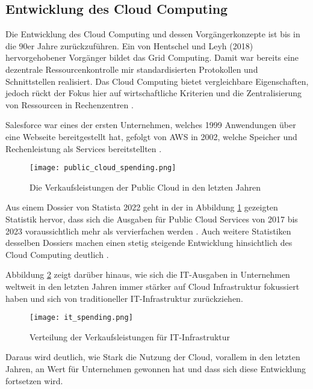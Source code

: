 \subsection{Entwicklung des Cloud Computing}
Die Entwicklung des Cloud Computing und dessen Vorgängerkonzepte ist bis in die 90er Jahre zurückzuführen. Ein von Hentschel und Leyh (2018) hervorgehobener Vorgänger bildet das Grid Computing. Damit war bereits eine dezentrale Ressourcenkontrolle mir standardisierten Protokollen und Schnittstellen realisiert. Das Cloud Computing bietet vergleichbare Eigenschaften, jedoch rückt der Fokus hier auf wirtschaftliche Kriterien und die Zentralisierung von Ressourcen in Rechenzentren \cite[Vgl.][S. 5f]{Reinheimer2018}.

Salesforce war eines der ersten Unternehmen, welches 1999 Anwendungen über eine Webseite bereitgestellt hat, gefolgt von \ac{AWS} in 2002, welche Speicher und Rechenleistung als Services bereitstellten \cite[Vgl.][S. 17f]{Srivastava2018}.

\begin{figure}[H]
    \texttt{[image: public\_cloud\_spending.png]}
    \caption{Die Verkaufsleistungen der Public Cloud in den letzten Jahren \cite[S. 8]{Statista2022}}
    \label{fig:public_cloud_spending}
\end{figure}

Aus einem Dossier von Statista 2022 geht in der in Abbildung \ref{fig:public_cloud_spending} gezeigten Statistik hervor, dass sich die Ausgaben für Public Cloud Services von 2017 bis 2023 voraussichtlich mehr als vervierfachen werden \cite[Vgl.][S. 8]{Statista2022}. Auch weitere Statistiken desselben Dossiers machen einen stetig steigende Entwicklung hinsichtlich des Cloud Computing deutlich \cite[Vgl. unter anderem][S. 11ff]{Statista2022}. \pagebreak

Abbildung \ref{fig:it-spending} zeigt darüber hinaus, wie sich die IT-Ausgaben in Unternehmen weltweit in den letzten Jahren immer stärker auf Cloud Infrastruktur fokussiert haben und sich von traditioneller IT-Infrastruktur zurückziehen.

\begin{figure}[H]
    \texttt{[image: it\_spending.png]}
    \caption{Verteilung der Verkaufsleistungen für IT-Infrastruktur \cite[S. 7]{Statista2022}}
    \label{fig:it-spending}
\end{figure}

Daraus wird deutlich, wie Stark die Nutzung der Cloud, vorallem in den letzten Jahren, an Wert für Unternehmen gewonnen hat und dass sich diese Entwicklung fortsetzen wird.

